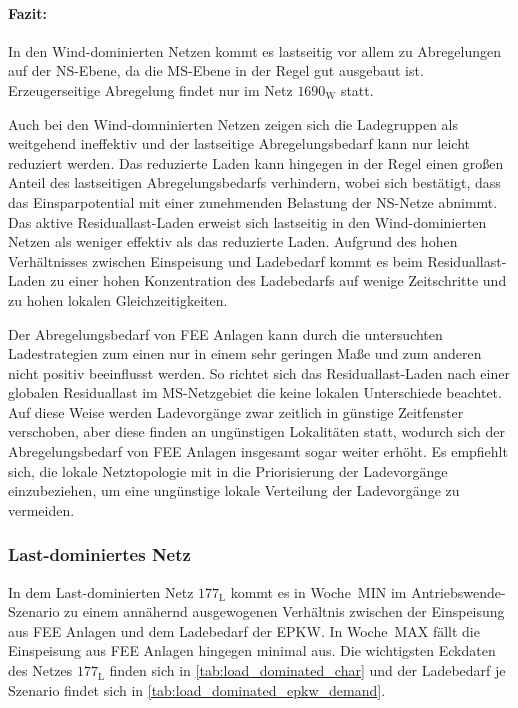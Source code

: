 \paragraph{Fazit:}

In den Wind-dominierten Netzen kommt es lastseitig vor allem zu Abregelungen auf der \gls{NS}-Ebene, da die \gls{MS}-Ebene in der Regel gut ausgebaut ist.
Erzeugerseitige Abregelung findet nur im Netz \(1690_{\text{W}}\) statt.\medskip

Auch bei den Wind-domninierten Netzen zeigen sich die Ladegruppen als weitgehend ineffektiv und der lastseitige Abregelungsbedarf kann nur leicht reduziert werden.
Das reduzierte Laden kann hingegen in der Regel einen großen Anteil des lastseitigen Abregelungsbedarfs verhindern, wobei sich bestätigt, dass das Einsparpotential mit einer zunehmenden Belastung der \gls{NS}-Netze abnimmt.
Das aktive Residuallast-Laden erweist sich lastseitig in den Wind-dominierten Netzen als weniger effektiv als das reduzierte Laden.
Aufgrund des hohen Verhältnisses zwischen Einspeisung und Ladebedarf kommt es beim Residuallast-Laden zu einer hohen Konzentration des Ladebedarfs auf wenige Zeitschritte und zu hohen lokalen Gleichzeitigkeiten.\medskip

Der Abregelungsbedarf von \gls{FEE} Anlagen kann durch die untersuchten Ladestrategien zum einen nur in einem sehr geringen Maße und zum anderen nicht positiv beeinflusst werden.
So richtet sich das Residuallast-Laden nach einer globalen Residuallast im \gls{MS}-Netzgebiet die keine lokalen Unterschiede beachtet.
Auf diese Weise werden Ladevorgänge zwar zeitlich in günstige Zeitfenster verschoben, aber diese finden an ungünstigen Lokalitäten statt, wodurch sich der Abregelungsbedarf von \gls{FEE} Anlagen insgesamt sogar weiter erhöht.
Es empfiehlt sich, die lokale Netztopologie mit in die Priorisierung der Ladevorgänge einzubeziehen, um eine ungünstige lokale Verteilung der Ladevorgänge zu vermeiden.


\subsubsection{Last-dominiertes Netz}

In dem Last-dominierten Netz \(177_{\text{L}}\) kommt es in Woche~MIN im Antriebswende-Szenario zu einem annähernd ausgewogenen Verhältnis zwischen der Einspeisung aus \gls{FEE} Anlagen und dem Ladebedarf der \gls{EPKW}.
In Woche~MAX fällt die Einspeisung aus \gls{FEE} Anlagen hingegen minimal aus.
Die wichtigsten Eckdaten des Netzes \(177_{\text{L}}\) finden sich in \autoref{tab:load_dominated_char} und der Ladebedarf je Szenario findet sich in \autoref{tab:load_dominated_epkw_demand}.


